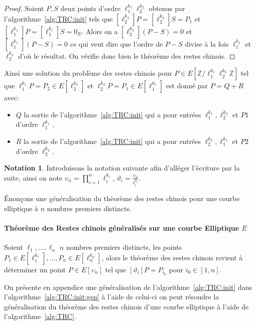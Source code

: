 \documentclass[10pt,a4paper]{book}
\theoremstyle{plain}
\theoremstyle{definition}
\theoremstyle{definition}
\theoremstyle{definition}
\theoremstyle{definition}
\theoremstyle{remark}
\theoremstyle{remark}
\theoremstyle{definition}
\newtheorem{nota}[thm]{Notation}
\begin{document}
\begin{proof}
Soient $P,S$ deux points d'ordre $\ell_1^{k_1}\ell_2^{k_2}$  obtenus par 
l'algorithme~\ref{alg:TRC:init}  tels que 
$[\ell_2^{k_2}]P=[\ell_2^{k_2}]S=P_1$ et  
$[\ell_1^{k_1}]P=[\ell_1^{k_1}]S=0_E$. Alors on a $[\ell_2^{k_2}](P-S)=0$ et 
$[\ell_1^{k_1}](P-S)=0$ ce qui veut dire que l'ordre de $P-S$ divise à la fois 
$\ell_1^{k_1}$ et $\ell_2^{k_2}$ d'où le résultat. On vérifie donc bien le 
théorème des restes chinois.
\end{proof}

Ainsi une solution du problème des restes chinois pour $P \in E[\mathbb{Z}/
\ell_1^{k_1} \ell_2^{k_2}\mathbb{Z}]$ tel que $\ell_1^{k_1}P=P_2 \in 
E[\ell_2^{k_2}]$ et $\ell_2^{k_2}P=P_1 \in E[\ell_1^{k_1}]$ est donné par 
$P=Q+R$ avec:
\begin{itemize}
\item $Q$ la sortie de l'algorithme~\ref{alg:TRC:init} qui a pour entrées
$\ell_1^{k_1}, \ell_2^{k_2}$ et $P1$ d'ordre $\ell_1^{k_1}$,
\item  $R$ la sortie de l'algorithme~\ref{alg:TRC:init} qui a pour entrées
$\ell_2^{k_2}, \ell_1^{k_1}$ et $P2$ d'ordre $\ell_2^{k_2}$.
\end{itemize}

\begin{nota}
Introduisons la notation suivante afin d'alléger l'écriture par la suite, 
ainsi on note $\upsilon_n=\prod_{i=1}^n \ell_i^{k_i}$, 
$\vartheta_i=\frac{\upsilon_n}{\ell_i^{k_i}}$.
\end{nota}

\'Enonçons une généralisation du thèorème des restes chinois pour une courbe 
elliptique à $n$ nombres premiers distincts.

\paragraph{Théorème des Restes chinois généralisés sur une courbe Elliptique $E$}
Soient $\ell_1, \dots, \ell_n$ $n$ nombres premiers distincts, les points $P_1 \in E[\ell_1^{k_1}], \dots, P_n \in E[\ell_n^{k_n}]$, alors le théorème des restes chinois revient à déterminer un point $P \in E[\upsilon_n]$ tel que $[\vartheta_i] P=P_{i_0}$ pour $i_0 \in [1,n]$.

On présente en appendice une généralisation de 
l'algorithme~\ref{alg:TRC:init} dans l'algorithme~\ref{alg:TRC:init:gen} à 
l'aide de celui-ci on peut résoudre la généralisation du théorème des restes 
chinois d'une courbe elliptique à l'aide de l'algorithme~\ref{alg:TRC}.
\end{document}
